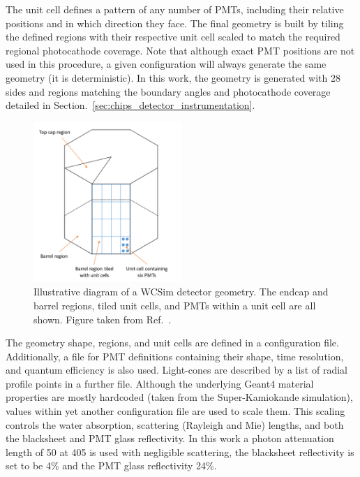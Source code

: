 The unit cell defines a pattern of any number of PMTs, including their relative positions and in
which direction they face. The final geometry is built by tiling the defined regions with their
respective unit cell scaled to match the required regional photocathode coverage. Note that
although exact PMT positions are not used in this procedure, a given configuration will always
generate the same geometry (it is deterministic). In this work, the \chipsfive geometry is
generated with 28 sides and regions matching the boundary angles and photocathode coverage
detailed in Section.~\ref{sec:chips_detector_instrumentation}.

\begin{figure} %
    \includegraphics[width=0.5\textwidth]{diagrams/4-chips/sim_geom.pdf}
    \caption[Illustrative diagram of a WCSim detector geometry]
    {Illustrative diagram of a WCSim detector geometry. The endcap and barrel regions, tiled unit
        cells, and PMTs within a unit cell are all shown. Figure taken from
        Ref.~\cite{blake2016}.}
    \label{fig:sim_geom}
\end{figure}

The geometry shape, regions, and unit cells are defined in a configuration file. Additionally, a
file for PMT definitions containing their shape, time resolution, and quantum efficiency is also
used. Light-cones are described by a list of radial profile points in a further file. Although the
underlying Geant4 material properties are mostly hardcoded (taken from the Super-Kamiokande
simulation), values within yet another configuration file are used to scale them. This scaling
controls the water absorption, scattering (Rayleigh and Mie) lengths, and both the blacksheet and
PMT glass reflectivity. In this work a photon attenuation length of \unit{50}{} at
\unit{405}{} is used with negligible scattering, the blacksheet reflectivity is set to be
4\% and the PMT glass reflectivity 24\%.

